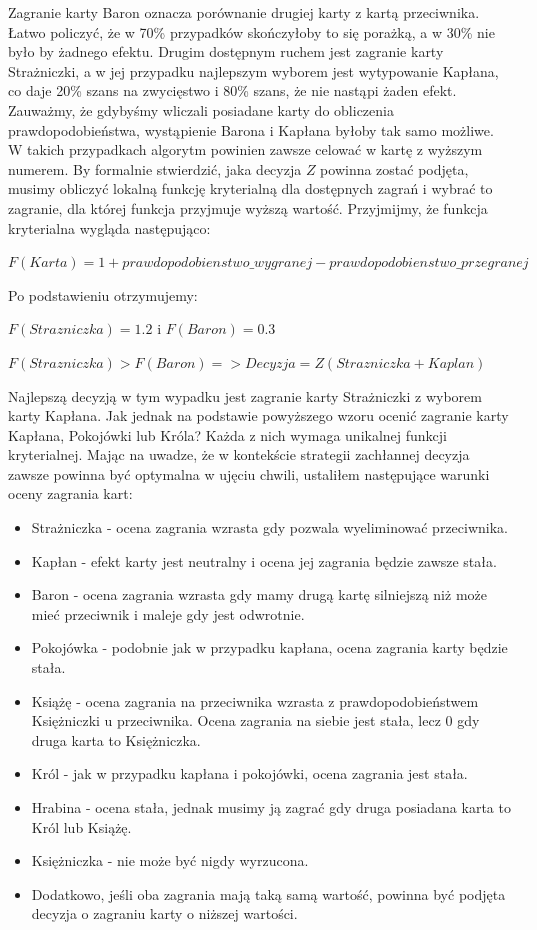 Zagranie karty Baron oznacza porównanie drugiej karty z kartą przeciwnika. Łatwo policzyć, że w 70\% przypadków skończyłoby to się porażką, a w 30\% nie było by żadnego efektu. Drugim dostępnym ruchem jest zagranie karty Strażniczki, a w jej przypadku najlepszym wyborem jest wytypowanie Kapłana, co daje 20\% szans na zwycięstwo i 80\% szans, że nie nastąpi żaden efekt. Zauważmy, że gdybyśmy wliczali posiadane karty do obliczenia prawdopodobieństwa, wystąpienie Barona i Kapłana byłoby tak samo możliwe. W takich przypadkach algorytm powinien zawsze celować w kartę z wyższym numerem. By formalnie stwierdzić, jaka decyzja $Z$ powinna zostać podjęta, musimy obliczyć lokalną funkcję kryterialną dla dostępnych zagrań i wybrać to zagranie, dla której funkcja przyjmuje wyższą wartość. Przyjmijmy, że funkcja kryterialna wygląda następująco:

\begin{center}
	$F(Karta) = 1 + prawdopodobienstwo\_wygranej - prawdopodobienstwo\_przegranej$
\end{center}
Po podstawieniu otrzymujemy:
\begin{center}
 $F(Strazniczka)=1.2$ i $F(Baron) = 0.3$
 
 $F(Strazniczka)>F(Baron) => Decyzja=Z(Strazniczka + Kaplan)$ 
\end{center} 

Najlepszą decyzją w tym wypadku jest zagranie karty Strażniczki z wyborem karty Kapłana. Jak jednak na podstawie powyższego wzoru ocenić zagranie karty Kapłana, Pokojówki lub Króla? Każda z nich wymaga unikalnej funkcji kryterialnej. Mając na uwadze, że w kontekście strategii zachłannej decyzja zawsze powinna być optymalna w ujęciu chwili, ustaliłem następujące warunki oceny zagrania kart:
\begin{itemize}
	\item Strażniczka - ocena zagrania wzrasta gdy pozwala wyeliminować przeciwnika.
	\item Kapłan - efekt karty jest neutralny i ocena jej zagrania będzie zawsze stała.
	\item Baron - ocena zagrania wzrasta gdy mamy drugą kartę silniejszą niż może mieć przeciwnik i maleje gdy jest odwrotnie.
	\item Pokojówka - podobnie jak w przypadku kapłana, ocena zagrania karty będzie stała.
	\item Książę - ocena zagrania na przeciwnika wzrasta z prawdopodobieństwem Księżniczki u przeciwnika. Ocena zagrania na siebie jest stała, lecz 0 gdy druga karta to Księżniczka.
	\item Król - jak w przypadku kapłana i pokojówki, ocena zagrania jest stała.
	\item Hrabina - ocena stała, jednak musimy ją zagrać gdy druga posiadana karta to Król lub Książę.
	\item Księżniczka - nie może być nigdy wyrzucona.
	\item Dodatkowo, jeśli oba zagrania mają taką samą wartość, powinna być podjęta decyzja o zagraniu karty o niższej wartości.
\end{itemize}

